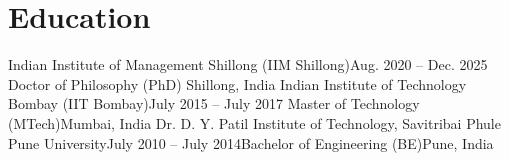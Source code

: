 \section{Education}
  \CVSubHeadingListStart
    \CVSubheading
      {{Indian Institute of Management Shillong (IIM Shillong)}}{Aug. 2020 -- Dec. 2025}
      {Doctor of Philosophy (PhD)} {Shillong, India}
    \CVSubheading
      {Indian Institute of Technology Bombay (IIT Bombay)}{July 2015 -- July 2017}
      {Master of Technology (MTech)}{Mumbai, India}
    \CVSubheading
      {Dr. D. Y. Patil Institute of Technology, Savitribai Phule Pune University}{July 2010 -- July 2014}{Bachelor of Engineering (BE)}{Pune, India}
  \CVSubHeadingListEnd
